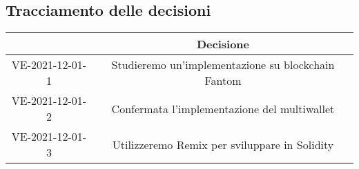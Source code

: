 \pagebreak

\subsection{Tracciamento delle decisioni}

\begin{table}[H]
	\centering
	\renewcommand{\arraystretch}{1.8}
	\begin{tabular}{c | c}
		\rowcolor[HTML]{125e28}
		\multicolumn{1}{c}{\color[HTML]{FFFFFF} \textbf{ID}} &
		\multicolumn{1}{c}{\color[HTML]{FFFFFF} \textbf{Decisione}} \\
		\hline
		VE-2021-12-01-1 & Studieremo un'implementazione su blockchain Fantom\\ \hline
		VE-2021-12-01-2 & Confermata l'implementazione del multiwallet\\ \hline
		VE-2021-12-01-3 & Utilizzeremo Remix per sviluppare in Solidity\\

	\end{tabular}
\end{table}